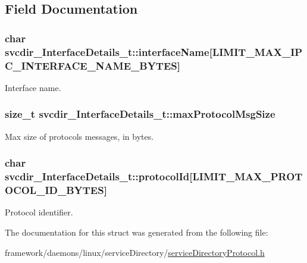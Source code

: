 \subsection{Field Documentation}
\subsubsection[{\texorpdfstring{interface\+Name}{interfaceName}}]{\setlength{\rightskip}{0pt plus 5cm}char svcdir\+\_\+\+Interface\+Details\+\_\+t\+::interface\+Name\mbox{[}{\bf L\+I\+M\+I\+T\+\_\+\+M\+A\+X\+\_\+\+I\+P\+C\+\_\+\+I\+N\+T\+E\+R\+F\+A\+C\+E\+\_\+\+N\+A\+M\+E\+\_\+\+B\+Y\+T\+ES}\mbox{]}}\hypertarget{structsvcdir___interface_details__t_a77f5893ba98bc6c857515f3bbf1d5864}{}\label{structsvcdir___interface_details__t_a77f5893ba98bc6c857515f3bbf1d5864}


Interface name. 

\subsubsection[{\texorpdfstring{max\+Protocol\+Msg\+Size}{maxProtocolMsgSize}}]{\setlength{\rightskip}{0pt plus 5cm}size\+\_\+t svcdir\+\_\+\+Interface\+Details\+\_\+t\+::max\+Protocol\+Msg\+Size}\hypertarget{structsvcdir___interface_details__t_ab309ca94952b674c82a197c1d9ebfb65}{}\label{structsvcdir___interface_details__t_ab309ca94952b674c82a197c1d9ebfb65}


Max size of protocol\textquotesingle{}s messages, in bytes. 

\subsubsection[{\texorpdfstring{protocol\+Id}{protocolId}}]{\setlength{\rightskip}{0pt plus 5cm}char svcdir\+\_\+\+Interface\+Details\+\_\+t\+::protocol\+Id\mbox{[}{\bf L\+I\+M\+I\+T\+\_\+\+M\+A\+X\+\_\+\+P\+R\+O\+T\+O\+C\+O\+L\+\_\+\+I\+D\+\_\+\+B\+Y\+T\+ES}\mbox{]}}\hypertarget{structsvcdir___interface_details__t_a7b29992a4baa1652b45d2eee1f70c25f}{}\label{structsvcdir___interface_details__t_a7b29992a4baa1652b45d2eee1f70c25f}


Protocol identifier. 



The documentation for this struct was generated from the following file\+:\begin{DoxyCompactItemize}
\item 
framework/daemons/linux/service\+Directory/\hyperlink{service_directory_protocol_8h}{service\+Directory\+Protocol.\+h}\end{DoxyCompactItemize}
